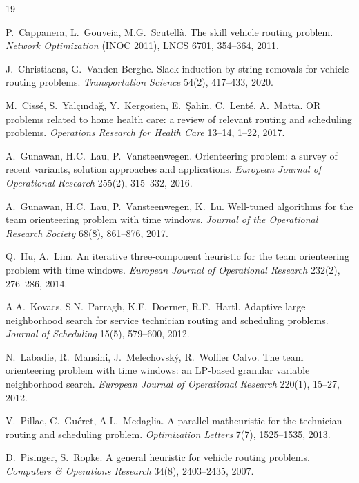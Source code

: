 \documentclass[10pt, a4paper]{article}
\begin{document}
\begin{thebibliography}{19}\small

 P.~Cappanera, L.~Gouveia, M.G.~Scutell\`a.
The skill vehicle routing problem. \emph{Network Optimization} (INOC 2011),
LNCS 6701, 354--364, 2011.

 J.~Christiaens, G.~Vanden Berghe.
Slack induction by string removals for vehicle routing problems.
\emph{Transportation Science} 54(2), 417--433, 2020.

 M.~Ciss\'e, S.~Yal\c{c}{\i}nda\u{g}, Y.~Kergosien,
E.~\c{S}ahin, C.~Lent\'e, A.~Matta. OR problems related to home health care:
a review of relevant routing and scheduling problems.
\emph{Operations Research for Health Care} 13--14, 1--22, 2017.

 A.~Gunawan, H.C.~Lau, P.~Vansteenwegen.
Orienteering problem: a survey of recent variants, solution approaches and
applications. \emph{European Journal of Operational Research} 255(2),
315--332, 2016.

 A.~Gunawan, H.C.~Lau, P.~Vansteenwegen, K.~Lu.
Well-tuned algorithms for the team orienteering problem with time windows.
\emph{Journal of the Operational Research Society} 68(8), 861--876, 2017.

 Q.~Hu, A.~Lim. An iterative three-component heuristic for
the team orienteering problem with time windows.
\emph{European Journal of Operational Research} 232(2), 276--286, 2014.

 A.A.~Kovacs, S.N.~Parragh, K.F.~Doerner, R.F.~Hartl.
Adaptive large neighborhood search for service technician routing and
scheduling problems. \emph{Journal of Scheduling} 15(5), 579--600, 2012.

 N.~Labadie, R.~Mansini, J.~Melechovsk\'y,
R.~Wolfler Calvo. The team orienteering problem with time windows: an
LP-based granular variable neighborhood search.
\emph{European Journal of Operational Research} 220(1), 15--27, 2012.

 V.~Pillac, C.~Gu\'eret, A.L.~Medaglia. A parallel
matheuristic for the technician routing and scheduling problem.
\emph{Optimization Letters} 7(7), 1525--1535, 2013.

 D.~Pisinger, S.~Ropke. A general heuristic for
vehicle routing problems. \emph{Computers \& Operations Research} 34(8),
2403--2435, 2007.


\end{thebibliography}
\end{document}
